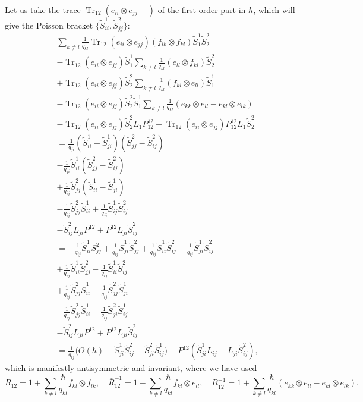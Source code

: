 \documentclass[11pt]{report}
\theoremstyle{definition}
\theoremstyle{remark}
\theoremstyle{remark}
\begin{document}
Let us take the trace $\operatorname{Tr}_{12} (e_{ii} \otimes e_{jj} -)$ of the first order part in $\hbar$, which will give the Poisson bracket $\{ \tilde S_{ii}^1, \tilde S_{jj}^2 \}$:
\begin{align*}
&\sum_{k \neq l} \frac{1}{q_{kl}} \operatorname{Tr}_{12} (e_{ii} \otimes e_{jj}) (f_{lk} \otimes f_{kl}) \tilde S_1^1 \tilde S_2^2 \\
&- \operatorname{Tr}_{12} (e_{ii} \otimes e_{jj})\tilde S_1^1 \sum_{k \neq l} \frac{1}{q_{kl}} (e_{ll} \otimes f_{kl}) \tilde S_2^2 \\
&+ \operatorname{Tr}_{12} (e_{ii} \otimes e_{jj})\tilde S_2^2 \sum_{k \neq l} \frac{1}{q_{kl}} (f_{kl} \otimes e_{ll}) \tilde S_1^1 \\
&- \operatorname{Tr}_{12} (e_{ii} \otimes e_{jj})\tilde S_2^2 \tilde S_1^1 \sum_{k \neq l} \frac{1}{q_{kl}} (e_{kk} \otimes e_{ll}-e_{kl} \otimes e_{lk}) \\
&- \operatorname{Tr}_{12} (e_{ii} \otimes e_{jj})\tilde S_2^2 L_1 P_{12}^{12} + \operatorname{Tr}_{12} (e_{ii} \otimes e_{jj})P_{12}^{12} L_1 \tilde S_2^2 \\
&= \frac{1}{q_{ji}} (\tilde S_{ii}^1-\tilde S_{ji}^1) (\tilde S_{jj}^2-\tilde S_{ij}^2) \\
&- \frac{1}{q_{ji}} \tilde S_{ii}^1 (\tilde S_{jj}^2-\tilde S_{ij}^2) \\
&+ \frac{1}{q_{ij}} \tilde S_{jj}^2 (\tilde S_{ii}^1-\tilde S_{ji}^1) \\
&- \frac{1}{q_{ij}} \tilde S_{jj}^2 \tilde S_{ii}^1 +
\frac{1}{q_{ji}} \tilde S_{ij}^1 \tilde S_{ij}^2 \\
&- \tilde S_{ij}^2 L_{ji} P^{12} + P^{12} L_{ji} \tilde S_{ij}^2 \\
&= -\frac{1}{q_{ij}} \tilde S_{ii}^1 S_{jj}^2 + \frac{1}{q_{ij}} \tilde S_{ji}^1 \tilde S_{jj}^2 + \frac{1}{q_{ij}} \tilde S_{ii}^1 \tilde S_{ij}^2 - \frac{1}{q_{ij}} \tilde S_{ji}^1 \tilde S_{ij}^2 \\
&+ \frac{1}{q_{ij}} \tilde S_{ii}^1 \tilde S_{jj}^2 - \frac{1}{q_{ij}} \tilde S_{ii}^1 \tilde S_{ij}^2 \\
&+ \frac{1}{q_{ij}} \tilde S_{jj}^2 \tilde S_{ii}^1-\frac{1}{q_{ij}} \tilde S_{jj}^2 \tilde S_{ji}^1 \\
&- \frac{1}{q_{ij}} \tilde S_{jj}^2 \tilde S_{ii}^1 -\frac{1}{q_{ij}} \tilde S_{ji}^2 \tilde S_{ij}^1 \\
&- \tilde S_{ij}^2 L_{ji} P^{12} + P^{12} L_{ji} \tilde S_{ij}^2 \\
&= \frac{1}{q_{ij}} \bigg( O(\hbar) - \tilde S_{ji}^1 \tilde S_{ij}^2 - \tilde S_{ji}^2 \tilde S_{ij}^1 \bigg) - P^{12}(\tilde S_{ji}^1 L_{ij} -L_{ji} \tilde S_{ij}^2),
\end{align*}
which is manifestly antisymmetric and invariant, where we have used
\begin{equation*}
R_{12} = 1 + \sum_{k \neq l} \frac{\hbar}{q_{kl}} f_{kl} \otimes f_{lk}, \quad
\bar R_{12}^{-1} = 1 - \sum_{k \neq l} \frac{\hbar}{q_{kl}} f_{kl} \otimes e_{ll}, \quad
\underline{R}_{12}^{-1} = 1 + \sum_{k \neq l} \frac{\hbar}{q_{kl}} (e_{kk} \otimes e_{ll} - e_{kl} \otimes e_{lk}).
\end{equation*}
\end{document}
